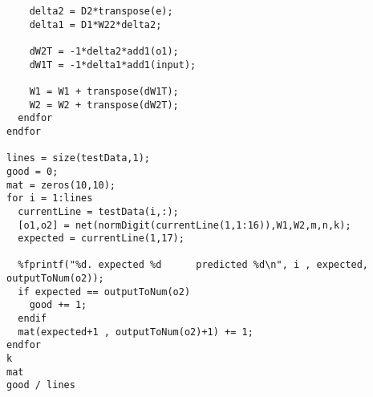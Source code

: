 \documentclass[a4paper,10pt]{article}
\begin{document}
\begin{lstlisting}
    delta2 = D2*transpose(e);
    delta1 = D1*W22*delta2;
    
    dW2T = -1*delta2*add1(o1);
    dW1T = -1*delta1*add1(input);

    W1 = W1 + transpose(dW1T);
    W2 = W2 + transpose(dW2T);
  endfor
endfor

lines = size(testData,1);
good = 0;
mat = zeros(10,10);
for i = 1:lines
  currentLine = testData(i,:);
  [o1,o2] = net(normDigit(currentLine(1,1:16)),W1,W2,m,n,k);
  expected = currentLine(1,17);
  
  %fprintf("%d. expected %d      predicted %d\n", i , expected, outputToNum(o2));
  if expected == outputToNum(o2)
    good += 1;
  endif
  mat(expected+1 , outputToNum(o2)+1) += 1;
endfor
k
mat
good / lines
		\end{lstlisting}
		
\end{document}
